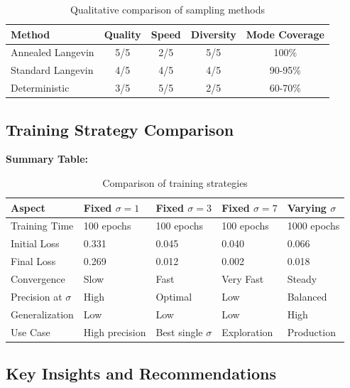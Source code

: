 \documentclass[journal]{IEEEtran}
\begin{document}
\begin{table}[H]
\centering
\begin{tabular}{lcccc}
\toprule
Method & Quality & Speed & Diversity & Mode Coverage \\
\midrule
Annealed Langevin & 5/5  & 2/5  & 5/5  & 100\% \\
Standard Langevin & 4/5  & 4/5  & 4/5  & 90-95\% \\
Deterministic & 3/5  & 5/5  & 2/5  & 60-70\% \\
\bottomrule
\end{tabular}
\caption{Qualitative comparison of sampling methods}
\label{tab:sampling_comparison}
\end{table}

\subsection{Training Strategy Comparison}

\textbf{Summary Table:}

\begin{table}[t]
\centering
\small
\setlength{\tabcolsep}{3pt}
\begin{tabular}{p{}p{}p{}p{}p{}}
\toprule
Aspect & Fixed $\sigma=1$ & Fixed $\sigma=3$ & Fixed $\sigma=7$ & Varying $\sigma$ \\
\midrule
Training Time & 100 epochs & 100 epochs & 100 epochs & 1000 epochs \\
Initial Loss & 0.331 & 0.045 & 0.040 & 0.066 \\
Final Loss & 0.269 & 0.012 & 0.002 & 0.018 \\
Convergence & Slow & Fast & Very Fast & Steady \\
Precision at $\sigma$ & High & Optimal & Low & Balanced \\
Generalization & Low & Low & Low & High \\
Use Case & High precision & Best single $\sigma$ & Exploration & Production \\
\bottomrule
\end{tabular}
\normalsize
\caption{Comparison of training strategies}
\label{tab:training_comparison}
\end{table}

\subsection{Key Insights and Recommendations}
\end{document}
